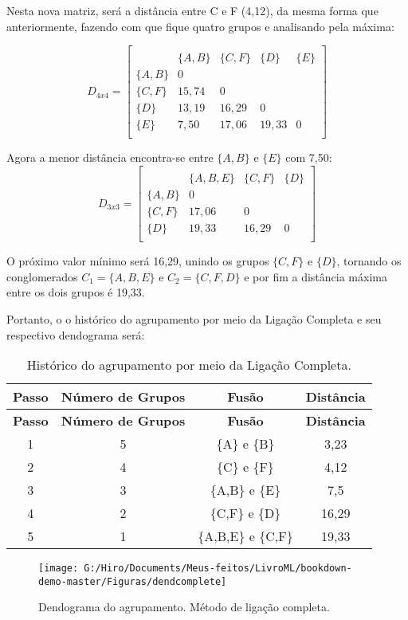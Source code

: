 \documentclass[
  openany]{book}
\begin{document}
Nesta nova matriz, será a distância entre C e F (4,12), da mesma forma que anteriormente, fazendo com que fique quatro grupos e analisando pela máxima:

\[D_{4x4}=\begin{bmatrix}\\
 &\{A,B\}& \{C,F\}&\{D\}&\{E\} \\
 \{A,B\}&0&&\\
 \{C,F\} & 15,74&0&&\\
 \{D\}& 13,19& 16,29&0&\\
 \{E\}& 7,50& 17,06& 19,33&0\\
\end{bmatrix}\]

Agora a menor distância encontra-se entre \(\{A,B\}\) e \(\{E\}\) com 7,50:
\[D_{3x3}=\begin{bmatrix}\\
 &\{A,B,E\}& \{C,F\}&\{D\} \\
 \{A,B\}&0&\\
 \{C,F\} & 17,06&0&\\
 \{D\}& 19,33& 16,29&0\\
\end{bmatrix}\]

O próximo valor mínimo será 16,29, unindo os grupos \(\{C,F\}\) e \(\{D\}\), tornando os conglomerados \(C_1=\{A,B,E\}\) e \(C_2=\{C,F,D\}\) e por fim a distância máxima entre os dois grupos é 19,33.

Portanto, o o histórico do agrupamento por meio da Ligação Completa e seu respectivo dendograma será:

\begin{longtable}[]{@{}cccc@{}}
\caption{\label{tab:ligcomplet} Histórico do agrupamento por meio da Ligação Completa.}\tabularnewline
\toprule
\textbf{Passo} & \textbf{Número de Grupos} & \textbf{Fusão} & \textbf{Distância}\tabularnewline
\midrule
\endfirsthead
\toprule
\textbf{Passo} & \textbf{Número de Grupos} & \textbf{Fusão} & \textbf{Distância}\tabularnewline
\midrule
\endhead
1 & 5 & \{A\} e \{B\} & 3,23\tabularnewline
2 & 4 & \{C\} e \{F\} & 4,12\tabularnewline
3 & 3 & \{A,B\} e \{E\} & 7,5\tabularnewline
4 & 2 & \{C,F\} e \{D\} & 16,29\tabularnewline
5 & 1 & \{A,B,E\} e \{C,F\} & 19,33\tabularnewline
\bottomrule
\end{longtable}

\begin{figure}

{\centering \texttt{[image: G:/Hiro/Documents/Meus-feitos/LivroML/bookdown-demo-master/Figuras/dendcomplete]} 

}

\caption{Dendograma do agrupamento. Método de ligação completa.}\label{fig:dendcomplete}
\end{figure}
\end{document}

